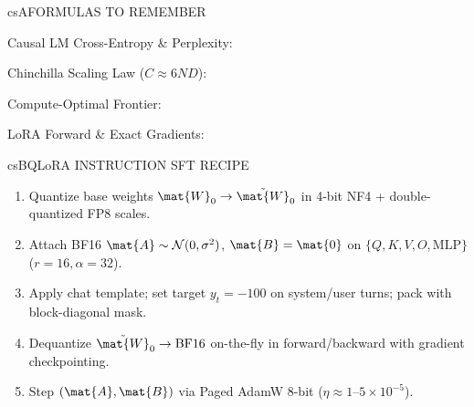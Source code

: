 \documentclass[../../../../master.tex]{subfiles}
\begin{document}

\csnextpage

\begin{cscolumns}
\begin{cscard}{csA}{FORMULAS TO REMEMBER}
  \begin{csbul}
    \item Causal LM Cross-Entropy \& Perplexity:
    \item Chinchilla Scaling Law ($C \approx 6ND$):
    \item Compute-Optimal Frontier:
    \item LoRA Forward \& Exact Gradients:
  \end{csbul}
\end{cscard}

\begin{cscard}{csB}{QLoRA INSTRUCTION SFT RECIPE}
  \begin{enumerate}[leftmargin=1.2em, itemsep=1pt, topsep=1pt, parsep=0pt]
    \item Quantize base weights $\mat{W}_0\to\tilde{\mat{W}}_0$ in 4-bit NF4 + double-quantized FP8 scales.
    \item Attach BF16 $\mat{A}\sim\mathcal{N}(0,\sigma^2)$, $\mat{B}=\mat{0}$ on $\{Q,K,V,O,\mathrm{MLP}\}$ ($r=16,\alpha=32$).
    \item Apply chat template; set target $y_t=-100$ on system/user turns; pack with block-diagonal mask.
    \item Dequantize $\tilde{\mat{W}}_0\to\text{BF16}$ on-the-fly in forward/backward with gradient checkpointing.
    \item Step $(\mat{A},\mat{B})$ via Paged AdamW 8-bit ($\eta \approx 1\text{--}5\times 10^{-5}$).
  \end{enumerate}
\end{cscard}
\columnbreak


\end{cscolumns}
\end{document}

